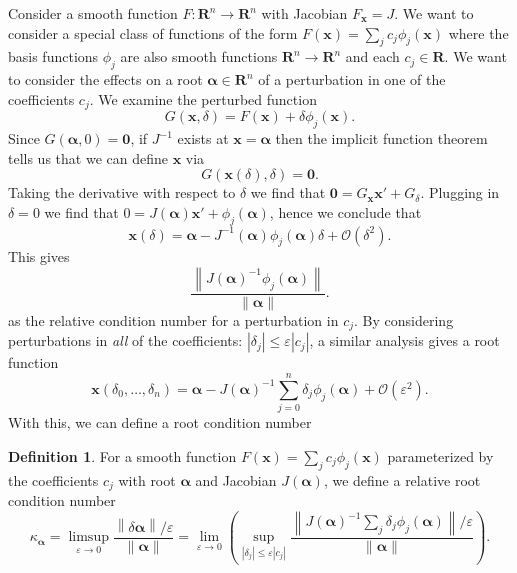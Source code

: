 \documentclass[3p, authoryear, square]{elsarticle}
\theoremstyle{definition}
\newtheorem{definition}{Definition}[section]
\newcommand{\reals}{\mathbf{R}}
\newcommand{\bigO}[1]{\mathcal{O}\left(#1\right)}
\newcommand{\eps}{\varepsilon}
\begin{document}
Consider a smooth function \(F: \reals^n \longrightarrow \reals^n\)
with Jacobian \(F_{\bm{x}} = J\). We want to consider a special class of
functions of the form \(F\left(\bm{x}\right) = \sum_j c_j
\phi_j\left(\bm{x}\right)\) where the basis
functions \(\phi_j\) are also smooth functions
\(\reals^n \longrightarrow \reals^n\)
and each \(c_j \in \reals\). We want to consider the effects on a root
\(\bm{\alpha} \in \reals^n\) of a perturbation in one of the
coefficients \(c_j\). We examine the perturbed function
\begin{equation}
G\left(\bm{x}, \delta\right) = F\left(\bm{x}\right) +
\delta \phi_j\left(\bm{x}\right).
\end{equation}
Since \(G\left(\bm{\alpha}, 0\right) = \bm{0}\), if \(J^{-1}\) exists at
\(\bm{x} = \bm{\alpha}\) then
the implicit function theorem tells us that we can define
\(\bm{x}\) via
\begin{equation}
G\left(\bm{x}\left(\delta\right), \delta\right) = \bm{0}.
\end{equation}
Taking the derivative with respect to \(\delta\) we find that
\(\bm{0} = G_{\bm{x}} \bm{x}' + G_{\delta}\). Plugging in
\(\delta = 0\) we find that \(0 = J\left(\bm{\alpha}\right) \bm{x}' +
\phi_j\left(\bm{\alpha}\right)\), hence we
conclude that
\begin{equation}
\bm{x}\left(\delta\right) = \bm{\alpha} - J^{-1}\left(\bm{\alpha}\right)
  \phi_j\left(\bm{\alpha}\right) \delta + \bigO{\delta^2}.
\end{equation}
This gives
\begin{equation}
\frac{\left \lVert J\left(\bm{\alpha}\right)^{-1}
  \phi_j\left(\bm{\alpha}\right) \right \rVert}{
  \left \lVert \bm{\alpha} \right \rVert}.
\end{equation}
as the relative condition number for a perturbation in \(c_j\).
By considering perturbations in \emph{all} of the coefficients:
\(\left|\delta_j\right| \leq \eps \left|c_j\right|\), a similar analysis
gives a root function
\begin{equation}
\bm{x}\left(\delta_0, \ldots, \delta_n\right) = \bm{\alpha} -
  J\left(\bm{\alpha}\right)^{-1} \sum_{j = 0}^n \delta_j
  \phi_j\left(\bm{\alpha}\right) + \bigO{\eps^2}.
\end{equation}
With this, we can define a root condition number

\begin{definition}\label{defn:abstract-cond-num}
For a smooth function \(F\left(\bm{x}\right) = \sum_j c_j
\phi_j\left(\bm{x}\right)\) parameterized by the coefficients
\(c_j\) with root \(\bm{\alpha}\) and Jacobian
\(J\left(\bm{\alpha}\right)\), we define a relative root condition
number
\begin{equation}
\kappa_{\bm{\alpha}} =
  \limsup_{\eps \to 0} \frac{\left \lVert\delta \bm{\alpha}
  \right \rVert / \eps}{\left \lVert\bm{\alpha}\right \rVert} =
  \lim_{\eps \to 0} \left(\sup_{\left|\delta_j\right| \leq
  \eps \left|c_j\right|} \frac{\left \lVert
  J\left(\bm{\alpha}\right)^{-1} \sum_j \delta_j
  \phi_j\left(\bm{\alpha}\right) \right \rVert / \eps}{
  \left \lVert\bm{\alpha}\right \rVert}\right).
\end{equation}
\end{definition}
\end{document}
